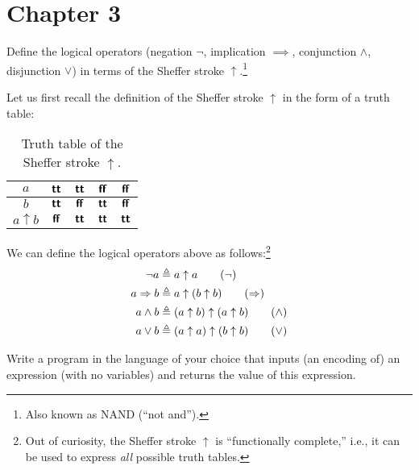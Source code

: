\newcommand{\sem}[1]
  {\ensuremath{\mathbcal{S}\llbracket#1\rrbracket}}
%
\newcommand{\asem}[1]
  {\ensuremath{\mathbcal{A}\llbracket#1\rrbracket}}
%
\newcommand{\bsem}[1]
  {\ensuremath{\mathbcal{B}\llbracket#1\rrbracket}}
%
\newcommand{\vren}[1]
  {\ensuremath{\iota\llbracket#1\rrbracket}}

\section*{Chapter 3}
%
\begin{exercise}{3.6}
  Define the logical operators (negation $\neg$, implication
  $\implies$, conjunction $\wedge$, disjunction $\vee$) in terms of
  the Sheffer stroke $\uparrow$.\footnote{Also known as NAND (``not and'').}
\end{exercise}
%
\begin{answer}
  Let us first recall the definition of the Sheffer stroke $\uparrow$
  in the form of a truth table:
  
  \begin{table}
    \centering
    \caption{Truth table of the Sheffer stroke $\uparrow$.}
    \begin{tabular}{c|c|c|c|c}
      $a$ & $\textbf{\textsf{tt}}$ & $\textbf{\textsf{tt}}$ & $\textbf{\textsf{ff}}$ & $\textbf{\textsf{ff}}$\\\hline
      $b$ & $\textbf{\textsf{tt}}$ & $\textbf{\textsf{ff}}$ & $\textbf{\textsf{tt}}$ & $\textbf{\textsf{ff}}$\\\hline
      $a \uparrow b$ & $\textbf{\textsf{ff}}$ & $\textbf{\textsf{tt}}$ & $\textbf{\textsf{tt}}$ & $\textbf{\textsf{tt}}$
    \end{tabular}
  \end{table}
  
  \noindent We can define the logical operators above as
  follows:\footnote{Out of curiosity, the Sheffer stroke $\uparrow$ is
    ``functionally complete,'' i.e., it can be used to express
    \emph{all} possible truth tables.}
  \begin{align*}
          \neg a &\isDefAs a \uparrow a\tag{$\neg$}\\
    a \implies b &\isDefAs a \uparrow (b \uparrow b)\tag{$\implies$}\\
    a   \wedge b &\isDefAs (a \uparrow b) \uparrow (a \uparrow b)\tag{$\wedge$}\\
    a     \vee b &\isDefAs (a \uparrow a) \uparrow (b \uparrow b)\tag{$\vee$}
  \end{align*}
\end{answer}
%
\begin{exercise}{3.7}
  Write a program in the language of your choice that inputs (an
  encoding of) an expression (with no variables) and returns the value
  of this expression.
\end{exercise}
